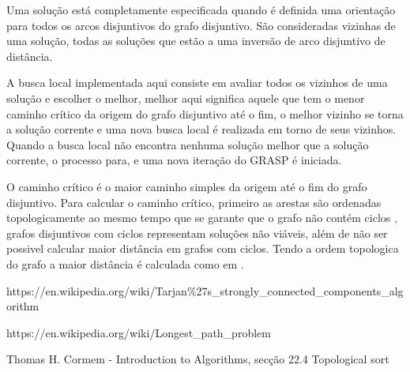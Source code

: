 \documentclass{article}
\begin{document}
Uma solução está completamente especificada quando é definida uma orientação
para todos os arcos disjuntivos do grafo disjuntivo. São consideradas
vizinhas de uma solução, todas as soluções que estão a uma inversão de
arco disjuntivo de distância.  

A busca local implementada aqui consiste em avaliar todos os vizinhos de uma 
solução e escolher o melhor, melhor aqui significa aquele que tem o menor 
caminho crítico da origem do grafo disjuntivo até o fim, o melhor vizinho 
se torna a solução corrente e uma nova busca local é realizada em torno de
seus vizinhos. Quando a busca local não encontra nenhuma solução melhor que 
a solução corrente, o processo para, e uma nova iteração do GRASP é iniciada.

O caminho crítico é o maior caminho simples da origem até o fim do grafo 
disjuntivo. Para calcular o caminho crítico, primeiro as arestas são ordenadas
topologicamente \cite{Cormem} ao mesmo tempo que se garante que o grafo não
contém ciclos \cite{tarjan}, grafos disjuntivos com ciclos representam soluções não viáveis,
além de não ser possivel calcular maior distância em grafos com ciclos. Tendo a
ordem topologica do grafo a maior distância é calculada como em \cite{longestPath}.




\begin{thebibliography}{9}
    https://en.wikipedia.org/wiki/Tarjan\%27s\_strongly\_connected\_components\_algorithm
    
    https://en.wikipedia.org/wiki/Longest\_path\_problem
    
    Thomas  H. Cormem - Introduction to Algorithms, secção 22.4 Topological sort

\end{thebibliography}
\end{document}
